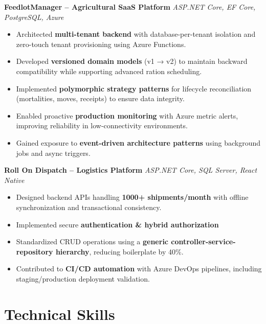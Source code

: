 \documentclass[a4paper,10pt]{article}
\begin{document}
\noindent\textbf{FeedlotManager – Agricultural SaaS Platform} \hfill \textit{ASP.NET Core, EF Core, PostgreSQL, Azure}
\vspace{2pt}
\begin{itemize}
    \item Architected \textbf{multi-tenant backend} with database-per-tenant isolation and zero-touch tenant provisioning using Azure Functions.
    \item Developed \textbf{versioned domain models} (v1 → v2) to maintain backward compatibility while supporting advanced ration scheduling.
    \item Implemented \textbf{polymorphic strategy patterns} for lifecycle reconciliation (mortalities, moves, receipts) to ensure data integrity.
    \item Enabled proactive \textbf{production monitoring} with Azure metric alerts, improving reliability in low-connectivity environments.
    \item Gained exposure to \textbf{event-driven architecture patterns} using background jobs and async triggers.
\end{itemize}

\medskip

\noindent\textbf{Roll On Dispatch – Logistics Platform} \hfill \textit{ASP.NET Core, SQL Server, React Native}
\vspace{2pt}
\begin{itemize}
    \item Designed backend APIs handling \textbf{1000+ shipments/month} with offline synchronization and transactional consistency.
    \item Implemented secure \textbf{authentication \& hybrid authorization}
    \item Standardized CRUD operations using a \textbf{generic controller-service-repository hierarchy}, reducing boilerplate by 40\%.
    \item Contributed to \textbf{CI/CD automation} with Azure DevOps pipelines, including staging/production deployment validation.
\end{itemize}

\vspace{2mm}

\section*{Technical Skills}
\end{document}
